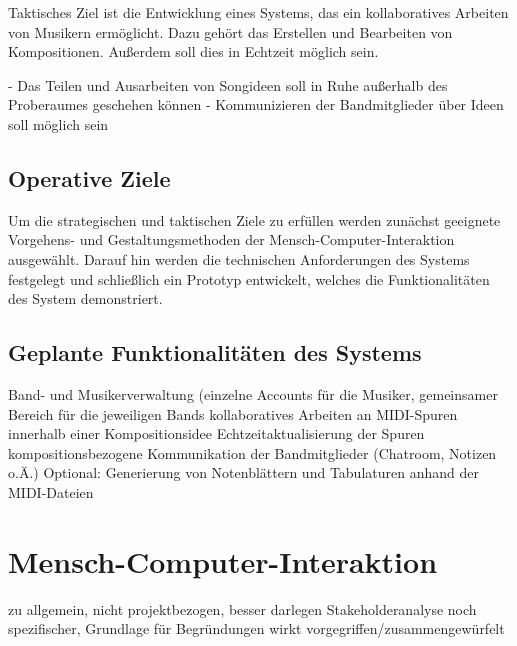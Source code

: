 \documentclass[12pt]{scrartcl}
\begin{document}
Taktisches Ziel ist die Entwicklung eines Systems, das ein kollaboratives Arbeiten von Musikern ermöglicht. Dazu gehört das Erstellen und Bearbeiten von Kompositionen. Außerdem soll dies in Echtzeit möglich sein.

- Das Teilen und Ausarbeiten von Songideen soll in Ruhe außerhalb des Proberaumes geschehen können
- Kommunizieren der Bandmitglieder über Ideen soll möglich sein


\subsection{Operative Ziele}

Um die strategischen und taktischen Ziele zu erfüllen werden zunächst geeignete Vorgehens- und Gestaltungsmethoden der Mensch-Computer-Interaktion ausgewählt. Darauf hin werden die technischen Anforderungen des Systems festgelegt und schließlich ein Prototyp entwickelt, welches die Funktionalitäten des System demonstriert.

\subsection[Geplante Funktionalitäten]{Geplante Funktionalitäten des Systems}

Band- und Musikerverwaltung (einzelne Accounts für die Musiker, gemeinsamer Bereich für die jeweiligen Bands
kollaboratives Arbeiten an MIDI-Spuren innerhalb einer Kompositionsidee
Echtzeitaktualisierung der Spuren
kompositionsbezogene Kommunikation der Bandmitglieder (Chatroom, Notizen o.Ä.)
Optional: Generierung von Notenblättern und Tabulaturen anhand der MIDI-Dateien




\section{Mensch-Computer-Interaktion}

zu allgemein, nicht projektbezogen, besser darlegen
Stakeholderanalyse noch spezifischer, Grundlage für Begründungen
wirkt vorgegriffen/zusammengewürfelt
\end{document}
